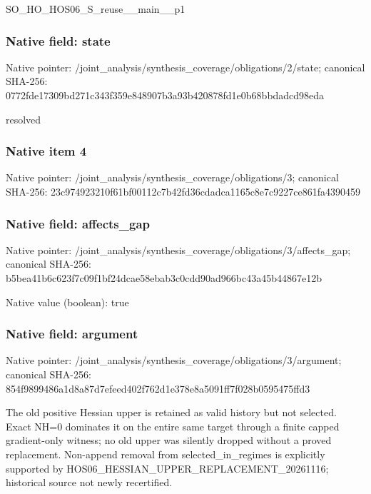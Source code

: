 \documentclass[10pt,a4paper]{article}
\begin{document}
\begingroup\raggedright\sloppy SO\_\allowbreak{}HO\_\allowbreak{}HOS06\_\allowbreak{}S\_\allowbreak{}reuse\_\allowbreak{}\_\allowbreak{}main\_\allowbreak{}\_\allowbreak{}p1\par\endgroup

\subsubsection{Native field: state}
Native pointer: /joint\_\allowbreak{}analysis/synthesis\_\allowbreak{}coverage/obligations/2/state; canonical SHA-256: 0772fde17309bd271c343f359e848907b3a93b420878fd1e0b68bbdadcd98eda

\begingroup\raggedright\sloppy resolved\par\endgroup

\subsubsection{Native item 4}
Native pointer: /joint\_\allowbreak{}analysis/synthesis\_\allowbreak{}coverage/obligations/3; canonical SHA-256: 23c974923210f61bf00112c7b42fd36cdadca1165c8e7c9227ce861fa4390459

\subsubsection{Native field: affects\_\allowbreak{}gap}
Native pointer: /joint\_\allowbreak{}analysis/synthesis\_\allowbreak{}coverage/obligations/3/affects\_\allowbreak{}gap; canonical SHA-256: b5bea41b6c623f7c09f1bf24dcae58ebab3c0cdd90ad966bc43a45b44867e12b

Native value (boolean): true

\subsubsection{Native field: argument}
Native pointer: /joint\_\allowbreak{}analysis/synthesis\_\allowbreak{}coverage/obligations/3/argument; canonical SHA-256: 854f9899486a1d8a87d7efeed402f762d1e378e8a5091ff7f028b0595475ffd3

\begingroup\raggedright\sloppy The old positive Hessian upper is retained as valid history but not selected. Exact NH=\allowbreak{}0 dominates it on the entire same target through a finite capped gradient-only witness;\allowbreak{} no old upper was silently dropped without a proved replacement. Non-append removal from selected\_\allowbreak{}in\_\allowbreak{}regimes is explicitly supported by HOS06\_\allowbreak{}HESSIAN\_\allowbreak{}UPPER\_\allowbreak{}REPLACEMENT\_\allowbreak{}20261116;\allowbreak{} historical source not newly recertified.\par\endgroup
\end{document}
